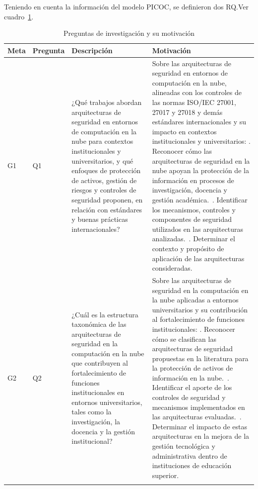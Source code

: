 Teniendo en cuenta la información del modelo PICOC, se definieron dos RQ.\@ Ver cuadro~\ref{tab:preguntas}.

\begin{table}[!t]
    \centering
    \renewcommand{\arraystretch}{1.4}
    \begin{tabularx}{\textwidth}{>{\centering\arraybackslash}m{} >{\centering\arraybackslash}m{} >{\raggedright\arraybackslash}X >{\raggedright\arraybackslash}X}
    \toprule
    \textbf{Meta} & \textbf{Pregunta} & \textbf{Descripción} & \textbf{Motivación} \\
    \midrule
    G1 & Q1 & ¿Qué trabajos abordan arquitecturas de seguridad en entornos de computación en la nube para contextos institucionales y universitarios, y qué enfoques de protección de activos, gestión de riesgos y controles de seguridad proponen, en relación con estándares y buenas prácticas internacionales? & Sobre las arquitecturas de seguridad en entornos de computación en la nube, alineadas con los controles de las normas ISO/IEC 27001, 27017 y 27018 y demás estándares internacionales y su impacto en contextos institucionales y universitarios: \newline
    1. Reconocer cómo las arquitecturas de seguridad en la nube apoyan la protección de la información en procesos de investigación, docencia y gestión académica.~\newline
    2. Identificar los mecanismos, controles y componentes de seguridad utilizados en las arquitecturas analizadas.~\newline
    3. Determinar el contexto y propósito de aplicación de las arquitecturas consideradas. \\
    \midrule
    G2 & Q2 & ¿Cuál es la estructura taxonómica de las arquitecturas de seguridad en la computación en la nube que contribuyen al fortalecimiento de funciones institucionales en entornos universitarios, tales como la investigación, la docencia y la gestión institucional? & Sobre las arquitecturas de seguridad en la computación en la nube aplicadas a entornos universitarios y su contribución al fortalecimiento de funciones institucionales: \newline
    1. Reconocer cómo se clasifican las arquitecturas de seguridad propuestas en la literatura para la protección de activos de información en la nube.~\newline
    2. Identificar el aporte de los controles de seguridad y mecanismos implementados en las arquitecturas evaluadas.~\newline
    3. Determinar el impacto de estas arquitecturas en la mejora de la gestión tecnológica y administrativa dentro de instituciones de educación superior. \\
    \bottomrule
    \vspace{1pt}
    \end{tabularx}
    \caption{Preguntas de investigación y su motivación}\label{tab:preguntas}
\end{table}

